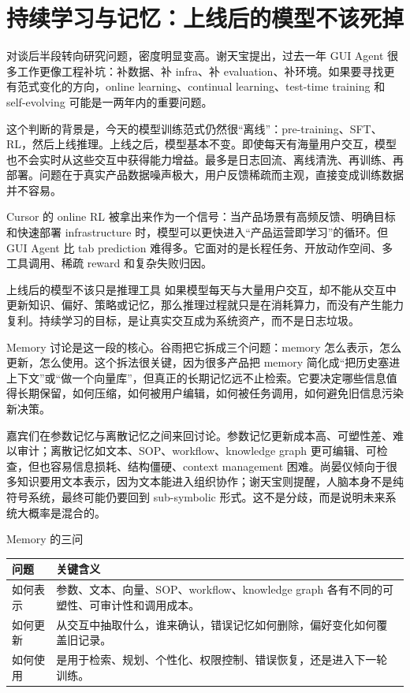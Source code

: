 \section{持续学习与记忆：上线后的模型不该死掉}

对谈后半段转向研究问题，密度明显变高。谢天宝提出，过去一年 GUI Agent 很多工作更像工程补坑：补数据、补 infra、补 evaluation、补环境。如果要寻找更有范式变化的方向，online learning、continual learning、test-time training 和 self-evolving 可能是一两年内的重要问题。

这个判断的背景是，今天的模型训练范式仍然很“离线”：pre-training、SFT、RL，然后上线推理。上线之后，模型基本不变。即使每天有海量用户交互，模型也不会实时从这些交互中获得能力增益。最多是日志回流、离线清洗、再训练、再部署。问题在于真实产品数据噪声极大，用户反馈稀疏而主观，直接变成训练数据并不容易。

Cursor 的 online RL 被拿出来作为一个信号：当产品场景有高频反馈、明确目标和快速部署 infrastructure 时，模型可以更快进入“产品运营即学习”的循环。但 GUI Agent 比 tab prediction 难得多。它面对的是长程任务、开放动作空间、多工具调用、稀疏 reward 和复杂失败归因。

\begin{importantbox}{上线后的模型不该只是推理工具}
如果模型每天与大量用户交互，却不能从交互中更新知识、偏好、策略或记忆，那么推理过程就只是在消耗算力，而没有产生能力复利。持续学习的目标，是让真实交互成为系统资产，而不是日志垃圾。
\end{importantbox}

Memory 讨论是这一段的核心。谷雨把它拆成三个问题：memory 怎么表示，怎么更新，怎么使用。这个拆法很关键，因为很多产品把 memory 简化成“把历史塞进上下文”或“做一个向量库”，但真正的长期记忆远不止检索。它要决定哪些信息值得长期保留，如何压缩，如何被用户编辑，如何被任务调用，如何避免旧信息污染新决策。

嘉宾们在参数记忆与离散记忆之间来回讨论。参数记忆更新成本高、可塑性差、难以审计；离散记忆如文本、SOP、workflow、knowledge graph 更可编辑、可检查，但也容易信息损耗、结构僵硬、context management 困难。尚晏仪倾向于很多知识要用文本表示，因为文本能进入组织协作；谢天宝则提醒，人脑本身不是纯符号系统，最终可能仍要回到 sub-symbolic 形式。这不是分歧，而是说明未来系统大概率是混合的。

\begin{knowledgebox}{Memory 的三问}
\begin{tabularx}{\textwidth}{>{\raggedright\arraybackslash}p{} Y}
\toprule
问题 & 关键含义 \\
\midrule
如何表示 & 参数、文本、向量、SOP、workflow、knowledge graph 各有不同的可塑性、可审计性和调用成本。 \\
如何更新 & 从交互中抽取什么，谁来确认，错误记忆如何删除，偏好变化如何覆盖旧记录。 \\
如何使用 & 是用于检索、规划、个性化、权限控制、错误恢复，还是进入下一轮训练。 \\
\bottomrule
\end{tabularx}
\end{knowledgebox}

